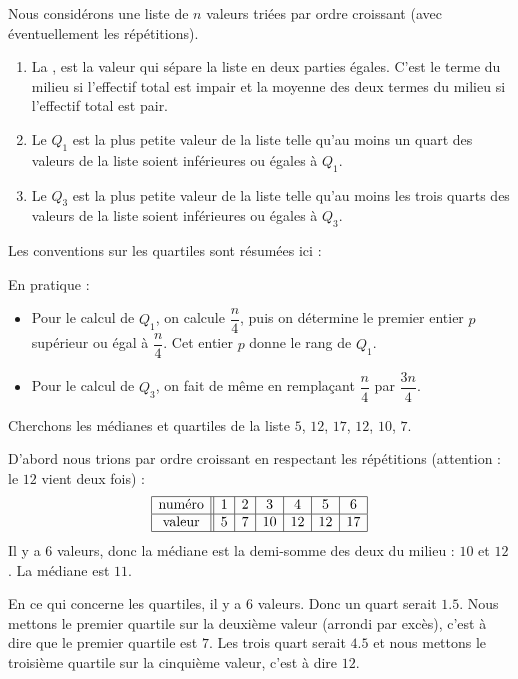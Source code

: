 \begin{definition}
    Nous considérons une liste de \( n\) valeurs triées par ordre croissant (avec éventuellement les répétitions).
    \begin{enumerate}
        \item
            La , est la valeur qui sépare la liste en deux parties égales. C'est le terme du milieu si l'effectif total est impair et la moyenne des deux termes du milieu si l'effectif total est pair.
      \item 
          Le  $Q_1$ est la plus petite valeur de la liste telle qu'au moins un quart des valeurs de la liste soient inférieures ou égales à $Q_1$.
        \item
            Le  $Q_3$ est la plus petite valeur de la liste telle qu'au moins les trois quarts des valeurs de la liste soient inférieures ou égales à $Q_3$.
  \end{enumerate}
\end{definition}
Les conventions sur les quartiles sont résumées ici :

\begin{center}
   
\end{center}

En pratique :
\begin{itemize}
    \item 
  Pour le calcul de $Q_1$, on calcule $\dfrac{n}4$, puis on détermine le premier entier $p$ supérieur ou égal à $\dfrac{n}4$. Cet entier $p$ donne le rang de $Q_1$. 
  \item
  Pour le calcul de $Q_3$, on fait de même en remplaçant $\dfrac{n}4$ par $\dfrac{3n}4$. 
\end{itemize}


\begin{example}
    Cherchons les médianes et quartiles de la liste $5$, $12$, $17$, $12$, $10$, $7$.

    D'abord nous trions par ordre croissant en respectant les répétitions (attention : le \( 12\) vient deux fois) : 
    \begin{equation*}
        \begin{array}[]{|c||c|c|c|c|c|c|}
            \hline
            \text{numéro}&1&2&3&4&5&6\\
            \hline
            \text{valeur}&5&7&10&12&12&17\\
            \hline
        \end{array}
    \end{equation*}
    Il y a \( 6\) valeurs, donc la médiane est la demi-somme des deux du milieu : \( 10\) et \( 12\). La médiane est \( 11\).

    En ce qui concerne les quartiles, il y a \( 6\) valeurs. Donc un quart serait \( 1.5\). Nous mettons le premier quartile sur la deuxième valeur (arrondi par excès), c'est à dire que le premier quartile est \( 7\). Les trois quart serait \( 4.5\) et nous mettons le troisième quartile sur la cinquième valeur, c'est à dire \( 12\).

\end{example}


